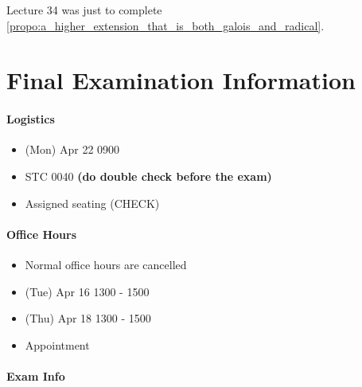 \documentclass[notoc,notitlepage,nobib]{tufte-book}
\begin{document}
\noindent
Lecture 34 was just to complete
\cref{propo:a_higher_extension_that_is_both_galois_and_radical}.

\section{Final Examination Information}%
\label{sec:final_examination_information}

\paragraph{Logistics}

\begin{itemize}
  \item (Mon) Apr 22 0900
  \item STC 0040 \textbf{(do double check before the exam)}
  \item Assigned seating (CHECK)
\end{itemize}

\paragraph{Office Hours}

\begin{itemize}
  \item Normal office hours are cancelled
  \item (Tue) Apr 16 1300 - 1500
  \item (Thu) Apr 18 1300 - 1500
  \item Appointment
\end{itemize}

\paragraph{Exam Info}
\end{document}
